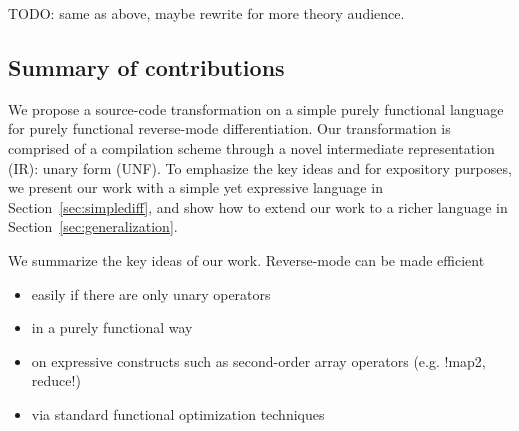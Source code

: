 TODO: same as above, maybe rewrite for more theory audience.

\subsection{Summary of contributions}

We propose a source-code transformation on a simple purely functional language for purely functional reverse-mode differentiation.
Our transformation is comprised of a compilation scheme through a novel intermediate representation (IR): unary form (UNF).
To emphasize the key ideas and for expository purposes, we present our work with a simple yet expressive language in Section~\ref{sec:simplediff}, 
and show how to extend our work to a richer language in Section~\ref{sec:generalization}.

We summarize the key ideas of our work. Reverse-mode can be made efficient
\begin{itemize}
   \item easily if there are only unary operators
   \item in a purely functional way
   \item on expressive constructs such as second-order array operators (e.g. !map2, reduce!) 
   \item via standard functional optimization techniques
\end{itemize}

